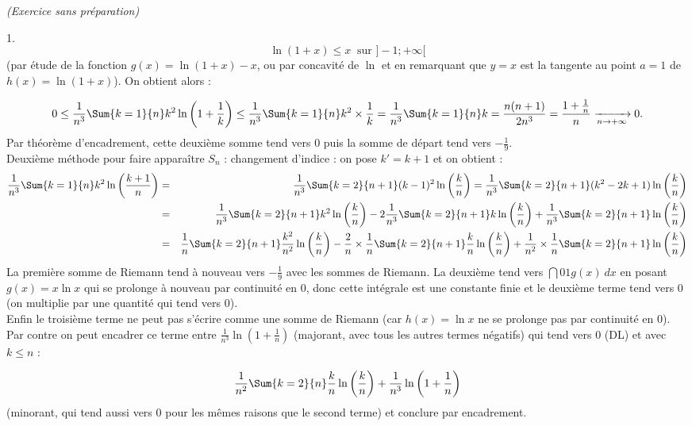 \documentclass[11pt]{article}%
\begin{document}
\begin{exercice}{\it (Exercice sans préparation)}
\begin{noliste}{1.}
\[
 \ln ( 1 + x ) \leq x \ \text{ sur } ]-1 ; + \infty[ 
\]
 (par étude de la fonction $g(x) = \ln (1 + x) - x$, ou par
 concavité de $\ln$ et en remarquant que $y = x$ est la tangente au
 point $a = 1$ de $ h(x) = \ln (1 + x)$). On obtient alors :
 
\[
 0 \leq \frac{1}{n^{3}} \Sum{k = 1}{n} k^{2} \ln \left( 1 + \frac{ 1 }{
k
 } \right) \leq \frac{1}{n^{3}} \Sum{k = 1}{n} k^{2} \times \frac{ 1 }{
 k } = \frac{ 1 }{ n^{3} } \Sum{k = 1}{n} k = \frac{ n (n + 1) }{ 2
n^{3}
 } = \frac{ 1 + \frac{ 1 }{ n } }{ n } \xrightarrow[ n \rightarrow
 + \infty ]{} 0.
\]
 Par théorème d'encadrement, cette deuxième somme tend vers 0 puis
 la somme de départ tend vers $- \frac{ 1 }{ 9 }$.\\
 Deuxième méthode pour faire apparaître $S_{n}$ : changement
 d'indice : on pose $k' = k + 1$ et on obtient :
 \begin{eqnarray*}
 \frac{1}{n^{3}} \Sum{k = 1}{n} k^{2} \ln \left( \frac{ k + 1 }{ n }
 \right) & = & \frac{1}{n^{3}} \Sum{k = 2}{n + 1} (k-1)^{2} \ln \left(
 \frac{ k }{ n } \right) = \frac{1}{n^{3}} \Sum{k = 2}{n + 1} (k^{2} -
 2 k + 1 ) \ln \left( \frac{ k }{ n } \right) \\
 & = & \frac{1}{n^{3}} \Sum{k = 2}{n + 1} k^{2} \ln \left( \frac{ k }{
n
 } \right) - 2 \frac{1}{n^{3}} \Sum{k = 2}{n + 1} k \ln \left( \frac{
 k }{ n } \right) + \frac{1}{n^{3}} \Sum{k = 2}{n + 1} \ln \left(
 \frac{ k }{ n } \right) \\
 & = & \frac{1}{n} \Sum{k = 2}{n + 1} \frac{ k^{2} }{ n^{2} } \ln
\left(
 \frac{ k }{ n } \right) - \frac{ 2 }{ n } \times \frac{ 1 }{
 n } \Sum{k = 2}{n + 1} \frac{ k }{ n } \ln \left( \frac{ k }{ n }
 \right) + \frac{1}{n^{2}} \times \frac{ 1 }{ n } \Sum{k = 2}{n + 1}
 \ln \left( \frac{ k }{ n } \right) 
 \end{eqnarray*}
 La première somme de Riemann tend à nouveau vers $- \frac{ 1 }{
 9}$ avec les sommes de Riemann. La deuxième tend vers $\dint{0}{1}
 g(x) \ dx $ en posant $g(x) = x \ln x$ qui se prolonge à nouveau
 par continuité en 0, donc cette intégrale est une constante finie
 et le deuxième terme tend vers 0 (on multiplie par une quantité
 qui tend vers 0).\\
 Enfin le troisième terme ne peut pas s'écrire comme une somme de
 Riemann (car $h(x) = \ln x$ ne se prolonge pas par continuité en
 0). Par contre on peut encadrer ce terme entre $ \frac{ 1 }{ n^{3} }
 \ln \left( 1 + \frac{ 1 }{ n } \right)$ (majorant, avec tous les
 autres termes négatifs) qui tend vers 0 (DL) et avec $k \leq n$ :
 
\[
 \frac{ 1 }{ n^{2}} \Sum{k = 2}{n} \frac{ k }{ n } \ln \left( \frac{ k
 }{ n } \right) + \frac{ 1 }{ n^{3} } \ln \left( 1 + \frac{ 1 }{ n
 } \right)
\]
 (minorant, qui tend aussi vers 0 pour les mêmes raisons que le
 second terme) et conclure par encadrement.
 \end{noliste}
\end{exercice}
\end{document}
